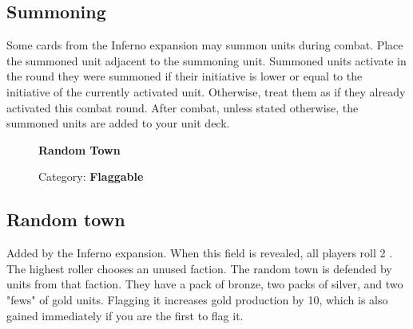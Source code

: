 \subsection*{Summoning}
Some cards from the Inferno expansion may summon units during combat.
Place the summoned unit adjacent to the summoning unit.
Summoned units activate in the round they were summoned if their initiative is lower or equal to the initiative of the currently activated unit.
Otherwise, treat them as if they already activated this combat round.
After combat, unless stated otherwise, the summoned units are added to your unit deck.

\begin{wrapfigure}{r}{0.5\textwidth}
  \begin{center}
    \textbf{Random Town}
    \caption{\scriptsize Category: \scriptsize\textbf{Flaggable}}
  \end{center}
\end{wrapfigure}
\subsection*{Random town}
Added by the Inferno expansion.
When this field is revealed, all players roll 2 .
The highest roller chooses an unused faction.
The random town is defended by units from that faction.
They have a pack of bronze, two packs of silver, and two "fews" of gold units.
Flagging it increases gold production by 10, which is also gained immediately if you are the first to flag it.
